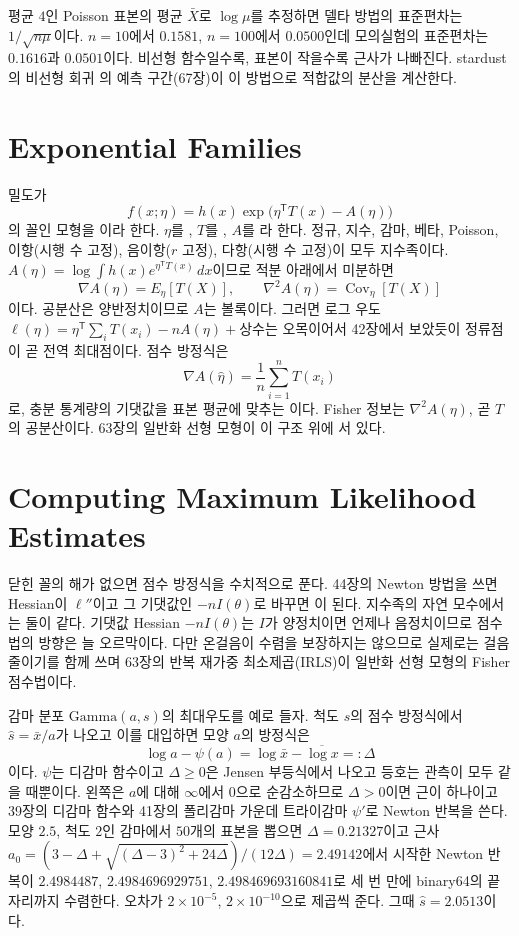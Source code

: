 평균 $4$인 Poisson 표본의 평균 $\bar X$로 $\log\mu$를 추정하면 델타 방법의 표준편차는 $1/\sqrt{n\mu}$이다. $n=10$에서 $0.1581$, $n=100$에서 $0.0500$인데 모의실험의 표준편차는 $0.1616$과 $0.0501$이다. 비선형 함수일수록, 표본이 작을수록 근사가 나빠진다. stardust의 비선형 회귀 의 예측 구간(67장)이 이 방법으로 적합값의 분산을 계산한다.

\section{Exponential Families}
\label{sec:exponential-family}

밀도가
\[
f(x;\eta)=h(x)\exp\bigl(\eta^{\mathsf T}T(x)-A(\eta)\bigr)
\]
의 꼴인 모형을 이라 한다. $\eta$를 , $T$를 , $A$를 라 한다. 정규, 지수, 감마, 베타, Poisson, 이항(시행 수 고정), 음이항($r$ 고정), 다항(시행 수 고정)이 모두 지수족이다. $A(\eta)=\log\int h(x)e^{\eta^{\mathsf T}T(x)}\,dx$이므로 적분 아래에서 미분하면
\[
\nabla A(\eta)=E_\eta[T(X)],\qquad\nabla^2A(\eta)=\operatorname{Cov}_\eta[T(X)]
\]
이다. 공분산은 양반정치이므로 $A$는 볼록이다. 그러면 로그 우도 $\ell(\eta)=\eta^{\mathsf T}\sum_iT(x_i)-nA(\eta)+\text{상수}$는 오목이어서 42장에서 보았듯이 정류점이 곧 전역 최대점이다. 점수 방정식은
\[
\nabla A(\hat\eta)=\frac1n\sum_{i=1}^nT(x_i)
\]
로, 충분 통계량의 기댓값을 표본 평균에 맞추는 이다. Fisher 정보는 $\nabla^2A(\eta)$, 곧 $T$의 공분산이다. 63장의 일반화 선형 모형이 이 구조 위에 서 있다.

\section{Computing Maximum Likelihood Estimates}
\label{sec:mle-computation}

닫힌 꼴의 해가 없으면 점수 방정식을 수치적으로 푼다. 44장의 Newton 방법을 쓰면 Hessian이 $\ell''$이고 그 기댓값인 $-nI(\theta)$로 바꾸면 이 된다. 지수족의 자연 모수에서는 둘이 같다. 기댓값 Hessian $-nI(\theta)$는 $I$가 양정치이면 언제나 음정치이므로 점수법의 방향은 늘 오르막이다. 다만 온걸음이 수렴을 보장하지는 않으므로 실제로는 걸음 줄이기를 함께 쓰며 63장의 반복 재가중 최소제곱(IRLS)이 일반화 선형 모형의 Fisher 점수법이다.

감마 분포 $\mathrm{Gamma}(a,s)$의 최대우도를 예로 들자. 척도 $s$의 점수 방정식에서 $\hat s=\bar x/a$가 나오고 이를 대입하면 모양 $a$의 방정식은
\[
\log a-\psi(a)=\log\bar x-\overline{\log x}=:\Delta
\]
이다. $\psi$는 디감마 함수이고 $\Delta\ge0$은 Jensen 부등식에서 나오고 등호는 관측이 모두 같을 때뿐이다. 왼쪽은 $a$에 대해 $\infty$에서 $0$으로 순감소하므로 $\Delta>0$이면 근이 하나이고 39장의 디감마 함수와 41장의 폴리감마 가운데 트라이감마 $\psi'$로 Newton 반복을 쓴다. 모양 $2.5$, 척도 $2$인 감마에서 $50$개의 표본을 뽑으면 $\Delta=0.21327$이고 근사 $a_0=(3-\Delta+\sqrt{(\Delta-3)^2+24\Delta})/(12\Delta)=2.49142$에서 시작한 Newton 반복이 $2.4984487$, $2.4984696929751$, $2.498469693160841$로 세 번 만에 binary64의 끝자리까지 수렴한다. 오차가 $2\times10^{-5}$, $2\times10^{-10}$으로 제곱씩 준다. 그때 $\hat s=2.0513$이다.

